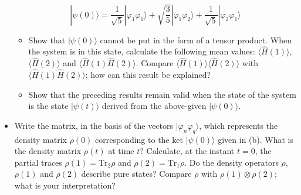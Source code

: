 \documentclass[12pt,a4paper]{article}
\newenvironment{problem}[2][Problem]{\begin{trivlist}
\item[\hskip \labelsep {\bfseries #1}\hskip \labelsep {\bfseries #2.}]}{\end{trivlist}}
\begin{document}
\begin{problem}{4}
\begin{itemize}
\[
|\psi(0)\rangle=\frac{1}{\sqrt{5}}|\varphi_1\varphi_1\rangle+\sqrt{\frac{3}{5}}|\varphi_1\varphi_2\rangle+\frac{1}{\sqrt{5}}|\varphi_2\varphi_1\rangle
\]
\begin{itemize}
\item[i.] Show that $|\psi(0)\rangle$ cannot be put in the form of a tensor product. When the system is in this state, calculate the following mean values: $\langle\hat{H}(1)\rangle$, $\langle\hat{H}(2)\rangle$ and $\langle\hat{H}(1)\hat{H}(2)\rangle$. Compare $\langle\hat{H}(1)\rangle\langle\hat{H}(2)\rangle$ with $\langle\hat{H}(1)\hat{H}(2)\rangle$; how can this result be explained?
\item[ii.] Show that the preceding results remain valid when the state of the system is the state $|\psi(t)\rangle$ derived from the above-given $|\psi(0)\rangle$.
\end{itemize}
\item[(e)] Write the matrix, in the basis of the vectors $|\varphi_n\varphi_q\rangle$, which represents the density matrix $\rho(0)$  corresponding to the ket $|\psi(0)\rangle$ given in (b). What is the density matrix $\rho(t)$ at time $t$? Calculate, at the instant $t=0$, the partial traces $\rho(1)=\text{Tr}_2\rho$ and $\rho(2)=\text{Tr}_1\rho$. Do the density operators $\rho$, $\rho(1)$ and $\rho(2)$ describe pure states? Compare $\rho$ with $\rho(1)\otimes\rho(2)$; what is your interpretation?
\end{itemize}
\end{problem}
\end{document}

